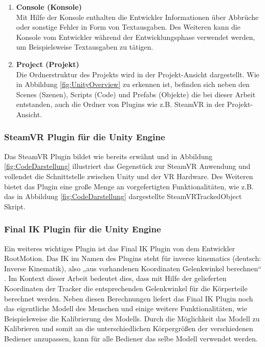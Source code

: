 \begin{enumerate}
	\item \textbf{Console (Konsole)} \\
	Mit Hilfe der Konsole enthalten die Entwickler Informationen über Abbrüche oder sonstige Fehler in Form von Textausgaben. Des Weiteren kann die Konsole vom Entwickler während der Entwicklungsphase verwendet werden, um Beispielsweise Textausgaben zu tätigen.
	\item \textbf{Project (Projekt)} \\
	Die Ordnerstruktur des Projekts wird in der Projekt-Ansicht dargestellt. Wie in Abbildung \ref{fig:UnityOverview} zu erkennen ist, befinden sich neben den Scenes (Szenen), Scripts (Code) und Prefabs (Objekte) die bei dieser Arbeit entstanden, auch die Ordner von Plugins wie z.B. SteamVR in der Projekt-Ansicht.
\end{enumerate}

\subsubsection{SteamVR Plugin für die Unity Engine}\label{sec:SteamVRPlugin}
Das SteamVR Plugin bildet wie bereits erwähnt und in Abbildung \ref{fig:CodeDarstellung} illustriert das Gegenstück zur SteamVR Anwendung und vollendet die Schnittstelle zwischen Unity und der VR Hardware. Des Weiteren bietet das Plugin eine große Menge an vorgefertigten Funktionalitäten, wie z.B. das in Abbildung \ref{fig:CodeDarstellung} dargestellte SteamVRTrackedObject Skript.

\subsubsection{Final IK Plugin für die Unity Engine}\label{sec:FinalIKPlugin}
Ein weiteres wichtiges Plugin ist das Final IK Plugin von dem Entwickler RootMotion. Das IK im Namen des Plugins steht für inverse kinematics (deutsch: Inverse Kinematik), also „aus vorhandenen Koordinaten Gelenkwinkel berechnen“ \cite[S.20]{31}. Im Kontext dieser Arbeit bedeutet dies, dass mit Hilfe der gelieferten Koordinaten der Tracker die entsprechenden Gelenkwinkel für die Körperteile berechnet werden. Neben diesen Berechnungen liefert das Final IK Plugin noch das eigentliche Modell des Menschen und einige weitere Funktionalitäten, wie Beispielsweise die Kalibrierung des Modells. Durch die Möglichkeit das Modell zu Kalibrieren und somit an die unterschiedlichen Körpergrößen der verschiedenen Bediener anzupassen, kann für alle Bediener das selbe Modell verwendet werden.

